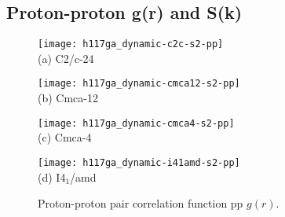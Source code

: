 \subsection{Proton-proton g(r) and S(k)}

\begin{figure}[h]
\centering
\begin{minipage}{0.49\textwidth}
\centering
\texttt{[image: h117ga\_dynamic-c2c-s2-pp]}\\
(a) C2/c-24
\end{minipage}
\begin{minipage}{0.49\textwidth}
\centering
\texttt{[image: h117ga\_dynamic-cmca12-s2-pp]}\\
(b) Cmca-12
\end{minipage}
\begin{minipage}{0.49\textwidth}
\centering
\texttt{[image: h117ga\_dynamic-cmca4-s2-pp]}\\
(c) Cmca-4
\end{minipage}
\begin{minipage}{0.49\textwidth}
\centering
\texttt{[image: h117ga\_dynamic-i41amd-s2-pp]}\\
(d) I4$_1$/amd
\end{minipage}
\caption{Proton-proton pair correlation function pp $g(r)$.}
\label{fig:hsolid-ppgr}
\end{figure}

